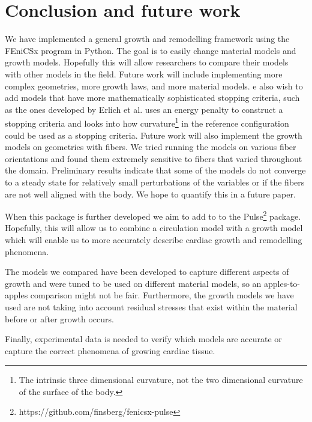 \section{Conclusion and future work}
We have implemented a general growth and remodelling framework using the FEniCSx program in Python. The goal is to easily change material models and growth models. Hopefully this will allow researchers to compare their models with other models in the field. Future work will include implementing more complex geometries, more growth laws, and more material models.  e also wish to add models that have more mathematically sophisticated stopping criteria, such as the ones developed by Erlich et al. \citep{Erlich2023} uses an energy penalty to construct a stopping criteria and \citep{Erlich2024} looks into how curvature\footnote{The intrinsic three dimensional curvature, not the two dimensional curvature of the surface of the body.} in the reference configuration could be used as a stopping criteria. Future work will also implement the growth models on geometries with fibers. We tried running the models on various fiber orientations and found them extremely sensitive to fibers that varied throughout the domain. Preliminary results indicate that some of the models do not converge to a steady state for relatively small perturbations of the variables or if the fibers are not well aligned with the body. We hope to quantify this in a future paper. \par
When this package is further developed we aim to add to to the Pulse\footnote{https://github.com/finsberg/fenicsx-pulse} package. Hopefully, this will allow us to combine a circulation model with a growth model which will enable us to more accurately describe cardiac growth and remodelling phenomena. \par
The models we compared have been developed to capture different aspects of growth and were tuned to be used on different material models, so an apples-to-apples comparison might not be fair. Furthermore, the growth models we have used are not taking into account residual stresses that exist within the material before or after growth occurs. \par
Finally, experimental data is needed to verify which models are accurate or capture the correct phenomena of growing cardiac tissue.


% 
